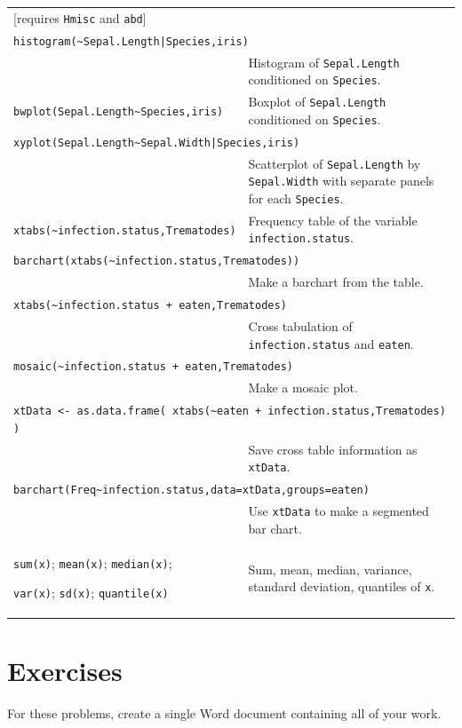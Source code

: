\begin{center}
\begin{longtable}{p{2.45in}p{4.10in}}
[requires \verb!Hmisc! and \verb!abd!]
\\[3mm]
\multicolumn{2}{l}{\texttt{histogram(\~{}Sepal.Length|Species,iris)}}
\\[1mm]
& 
Histogram of \verb!Sepal.Length! conditioned on \verb!Species!.
\\[3mm]
\verb!bwplot(Sepal.Length~Species,iris)! & 
Boxplot of \verb!Sepal.Length! conditioned on \verb!Species!.
\\[3mm]
\multicolumn{2}{l}{\texttt{xyplot(Sepal.Length\~{}Sepal.Width|Species,iris)}} 
\\[1mm]
& 
Scatterplot of \verb!Sepal.Length! by \verb!Sepal.Width! 
with separate panels for each  \verb!Species!.
\\[3mm]
\verb!xtabs(~infection.status,Trematodes)! & Frequency table of the variable \verb!infection.status!.
\\[3mm]
\multicolumn{2}{l}{\texttt{barchart(xtabs(\~{}infection.status,Trematodes))}}
\\[1mm]
& Make a barchart from the table.
\\[3mm]
\multicolumn{2}{l}{\texttt{xtabs(\~{}infection.status + eaten,Trematodes)}}
\\[1mm]
& Cross tabulation of \verb!infection.status!  and \verb!eaten!.
\\[3mm]
\multicolumn{2}{l}{
\texttt{mosaic(\~{}infection.status + eaten,Trematodes)} }
\\[1mm]
& Make a mosaic plot.
\\[3mm]
\multicolumn{2}{l}{
\texttt{xtData <- as.data.frame( xtabs(\~{}eaten + infection.status,Trematodes) )}}
\\[1mm]
  & Save cross table information as \verb!xtData!. 
\\[3mm]
\multicolumn{2}{l}{
\texttt{barchart(Freq\~{}infection.status,data=xtData,groups=eaten)}
}
\\[1mm]
& Use \verb!xtData! to make a segmented bar chart.
\\[3mm]
\verb!sum(x)!; 
\verb!mean(x)!; 
\verb!median(x)!;

\verb!var(x)!; 
\verb!sd(x)!; 
\verb!quantile(x)!
& Sum, mean, 
median,
variance,
standard deviation,
quantiles of \verb!x!.
\\
\end{longtable}
\end{center}

\vspace*{-.5in}
\section{Exercises}

For these problems, create a single Word document containing all of your work.

\shipoutProblems


